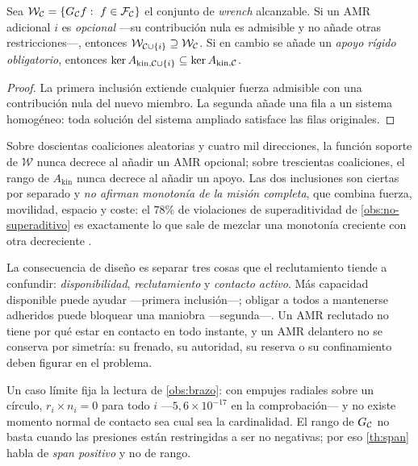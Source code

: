 \begin{teorema}
\label{th:dos-monotonias}
Sea $\mathcal W_{\Ccal}=\{G_{\Ccal}f:\ f\in\Fcal_{\Ccal}\}$ el conjunto de
\emph{wrench} alcanzable. Si un AMR adicional $i$ es \emph{opcional} —su
contribución nula es admisible y no añade otras restricciones—, entonces
$\mathcal W_{\mathcal{C}\cup\{i\}}\supseteq\mathcal W_{\mathcal{C}}$. Si en cambio se añade un
\emph{apoyo rígido obligatorio}, entonces
$\ker A_{\mathrm{kin},\mathcal{C}\cup\{i\}}\subseteq\ker A_{\mathrm{kin},\mathcal{C}}$.
\end{teorema}

\begin{proof}
La primera inclusión extiende cualquier fuerza admisible con una contribución
nula del nuevo miembro. La segunda añade una fila a un sistema homogéneo: toda
solución del sistema ampliado satisface las filas originales.
\end{proof}

\begin{observacion}
\label{obs:dos-monotonias}
Sobre doscientas coaliciones aleatorias y cuatro mil direcciones, la función
soporte de $\mathcal W$ nunca decrece al añadir un AMR opcional; sobre trescientas
coaliciones, el rango de $A_{\mathrm{kin}}$ nunca decrece al añadir un apoyo. Las
dos inclusiones son ciertas por separado y \emph{no afirman monotonía de la
misión completa}, que combina fuerza, movilidad, espacio y coste: el $78\%$ de
violaciones de superaditividad de \cref{obs:no-superaditivo} es exactamente lo
que sale de mezclar una monotonía creciente con otra decreciente
\cite{mayorga2026m1}.

La consecuencia de diseño es separar tres cosas que el reclutamiento tiende a
confundir: \emph{disponibilidad}, \emph{reclutamiento} y \emph{contacto activo}.
Más capacidad disponible puede ayudar —primera inclusión—; obligar a todos a
mantenerse adheridos puede bloquear una maniobra —segunda—. Un AMR reclutado no
tiene por qué estar en contacto en todo instante, y un AMR delantero no se
conserva por simetría: su frenado, su autoridad, su reserva o su confinamiento
deben figurar en el problema.

Un caso límite fija la lectura de \cref{obs:brazo}: con empujes radiales sobre
un círculo, $r_i\times n_i=0$ para todo $i$ —$5{,}6\times10^{-17}$ en la
comprobación— y no existe momento normal de contacto sea cual sea la
cardinalidad. El rango de $G_{\mathcal{C}}$ no basta cuando las presiones están
restringidas a ser no negativas; por eso \cref{th:span} habla de \emph{span
positivo} y no de rango.
\end{observacion}

